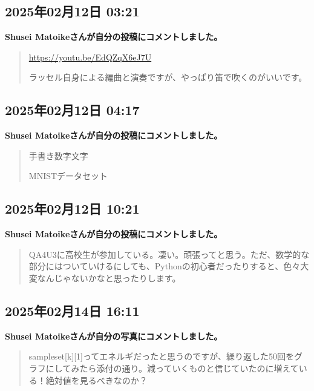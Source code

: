 \subsection*{2025年02月12日 03:21}

\textbf{Shusei Matoikeさんが自分の投稿にコメントしました。}

\begin{quote}
\url{https://youtu.be/EdQZqX6eJ7U}

ラッセル自身による編曲と演奏ですが、やっぱり笛で吹くのがいいです。
\end{quote}

\subsection*{2025年02月12日 04:17}

\textbf{Shusei Matoikeさんが自分の投稿にコメントしました。}

\begin{quote}
手書き数字文字

MNISTデータセット
\end{quote}

\subsection*{2025年02月12日 10:21}

\textbf{Shusei Matoikeさんが自分の投稿にコメントしました。}

\begin{quote}
QA4U3に高校生が参加している。凄い。頑張ってと思う。ただ、数学的な部分にはついていけるにしても、Pythonの初心者だったりすると、色々大変なんじゃないかなと思ったりします。
\end{quote}

\subsection*{2025年02月14日 16:11}

\textbf{Shusei Matoikeさんが自分の写真にコメントしました。}

\begin{quote}
sampleset[k][1]ってエネルギだったと思うのですが、繰り返した50回をグラフにしてみたら添付の通り。減っていくものと信じていたのに増えている！絶対値を見るべきなのか？
\end{quote}

